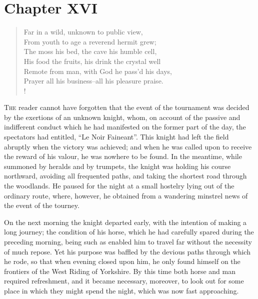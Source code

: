 \chapter{Chapter XVI}

\begin{verse}
Far in a wild, unknown to public view,\\
From youth to age a reverend hermit grew;\\
The moss his bed, the cave his humble cell,\\
His food the fruits, his drink the crystal well\\
Remote from man, with God he pass'd his days,\\
Prayer all his business--all his pleasure praise.\\!
\end{verse}

\lettrine{T}{he} reader cannot have forgotten that the event of the
tournament was
decided by the exertions of an unknown knight, whom, on account of the
passive and indifferent conduct which he had manifested on the former
part of the day, the spectators had entitled, ``Le Noir Faineant''. This
knight had left the field abruptly when the victory was achieved; and
when he was called upon to receive the reward of his valour, he was
nowhere to be found. In the meantime, while summoned by heralds and by
trumpets, the knight was holding his course northward, avoiding all
frequented paths, and taking the shortest road through the woodlands. He
paused for the night at a small hostelry lying out of the ordinary
route, where, however, he obtained from a wandering minstrel news of the
event of the tourney.

On the next morning the knight departed early, with the intention of
making a long journey; the condition of his horse, which he had
carefully spared during the preceding morning, being such as enabled him
to travel far without the necessity of much repose. Yet his purpose was
baffled by the devious paths through which he rode, so that when evening
closed upon him, he only found himself on the frontiers of the West
Riding of Yorkshire. By this time both horse and man required
refreshment, and it became necessary, moreover, to look out for some
place in which they might spend the night, which was now fast
approaching.

